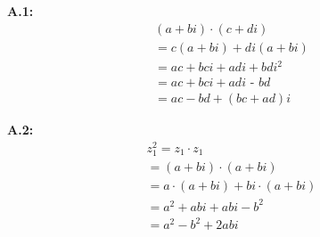 
\noindent\textbf{A.1:}\label{app:1}
\begin{equation}\tag{A.1}\label{eq:complex-numbers-multiplication}
  \begin{split}
    (a + bi) \cdot (c + di) \\
    =  c(a + bi) + di(a + bi) \\
    = ac +bci + adi + bdi^2 \\
    = ac + bci + adi \textbf{ - } bd \\
    = ac - bd +(bc + ad)i
  \end{split}
\end{equation}

\noindent\textbf{A.2:}\label{app:2}
\begin{equation}\tag{A.2}\label{eq:complex-numbes-squaring}
  \begin{split}
    z_1^2
    = z_1 \cdot z_1 \\
    = (a + bi) \cdot (a + bi) \\
    = a \cdot (a + bi) + bi \cdot (a + bi) \\
    = a^2 + abi + abi - b^2 \\
    = a^2 - b^2 + 2abi
  \end{split}
\end{equation}